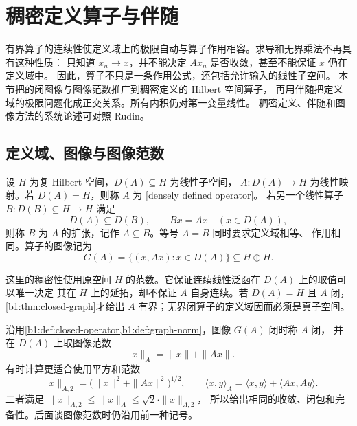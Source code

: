 \section{稠密定义算子与伴随}
\label{b1:sec:2905}


有界算子的连续性使定义域上的极限自动与算子作用相容。求导和无界乘法不再具有这种性质：
只知道 \(x_n\to x\)，并不能决定 \(Ax_n\) 是否收敛，甚至不能保证 \(x\) 仍在定义域中。
因此，算子不只是一条作用公式，还包括允许输入的线性子空间。
本节把的闭图像与图像范数推广到稠密定义的 Hilbert 空间算子，
再用伴随把定义域的极限问题化成正交关系。所有内积仍对第一变量线性。
稠密定义、伴随和图像方法的系统论述可对照 Rudin\cite[13.1, 13.3, 13.7--13.12]{Rudin1991Functional}。

\subsection{定义域、图像与图像范数}
\label{b1:subsec:290501}

\begin{definition}[稠密定义与算子扩张]
\label{b1:def:29-densely-defined}
设 \(H\) 为复 Hilbert 空间，\(D(A)\subseteq H\) 为线性子空间，
\(A:D(A)\to H\) 为线性映射。若 \(\overline{D(A)}=H\)，则称 \(A\) 为
[densely defined operator]。
若另一个线性算子 \(B:D(B)\subseteq H\to H\) 满足
\[
 D(A)\subseteq D(B),\qquad Bx=Ax\quad(x\in D(A)),
\]
则称 \(B\) 为 \(A\) 的扩张，记作 \(A\subseteq B\)。等号 \(A=B\) 同时要求定义域相等、
作用相同。算子的图像记为
\[
 G(A)=\{(x,Ax):x\in D(A)\}\subseteq H\oplus H.
\]
\end{definition}

这里的稠密性使用原空间 \(H\) 的范数。它保证连续线性泛函在 \(D(A)\) 上的取值可以唯一决定
其在 \(H\) 上的延拓，却不保证 \(A\) 自身连续。若 \(D(A)=H\) 且 \(A\) 闭，
\cref{b1:thm:closed-graph}才给出 \(A\) 有界；无界闭算子的定义域因而必须是真子空间。

\ProseParagraphBreak

沿用\cref{b1:def:closed-operator,b1:def:graph-norm}，图像 \(G(A)\) 闭时称 \(A\) 闭，
并在 \(D(A)\) 上取图像范数
\[
 \|x\|_A=\|x\|+\|Ax\|.
\]
有时计算更适合使用平方和范数
\[
 \|x\|_{A,2}=\bigl(\|x\|^2+\|Ax\|^2\bigr)^{1/2},\qquad
 \langle x,y\rangle_A=\langle x,y\rangle+\langle Ax,Ay\rangle.
\]
二者满足 \(\|x\|_{A,2}\leq\|x\|_A\leq\sqrt2\cdot\|x\|_{A,2}\)，
所以给出相同的收敛、闭包和完备性。后面谈图像范数时仍沿用前一种记号。

